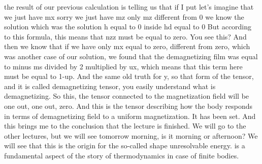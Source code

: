 the result of our previous calculation is telling us that if I put let's imagine that we just have mx sorry we just have mz only mz different from 0 we know the solution which was the solution h equal to 0 inside hd equal to 0 But according to this formula, this means that nzz must be equal to zero. You see this? And then we know that if we have only mx equal to zero, different from zero, which was another case of our solution, we found that the demagnetizing film was equal to minus ms divided by 2 multiplied by ux, which means that this term here must be equal to 1-up. And the same old truth for y, so that form of the tensor, and it is called demagnetizing tensor, you easily understand what is demagnetizing. So this, the tensor connected to the magnetization field will be one out, one out, zero. And this is the tensor describing how the body responds in terms of demagnetizing field to a uniform magnetization. It has been set. And this brings me to the conclusion that the lecture is finished. We will go to the other lectures, but we will see tomorrow morning, is it morning or afternoon? We will see that this is the origin for the so-called shape unresolvable energy. is a fundamental aspect of the story of thermodynamics in case of finite bodies.